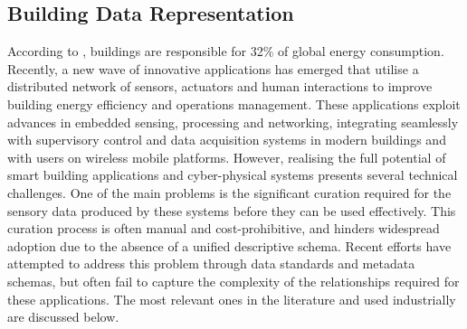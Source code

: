 \subsection*{Building Data Representation}

According to \cite{Balaji2018}, buildings are responsible for 32\% of global energy consumption.
Recently, a new wave of innovative applications has emerged that utilise a distributed network of sensors, actuators and human interactions to improve building energy efficiency and operations management.
These applications exploit advances in embedded sensing, processing and networking, integrating seamlessly with supervisory control and data acquisition systems in modern buildings and with users on wireless mobile platforms.
However, realising the full potential of smart building applications and cyber-physical systems presents several technical challenges.
One of the main problems is the significant curation required for the sensory data produced by these systems before they can be used effectively.
This curation process is often manual and cost-prohibitive, and hinders widespread adoption due to the absence of a unified descriptive schema.
Recent efforts have attempted to address this problem through data standards and metadata schemas, but often fail to capture the complexity of the relationships required for these applications.
The most relevant ones in the literature and used industrially are discussed below.

